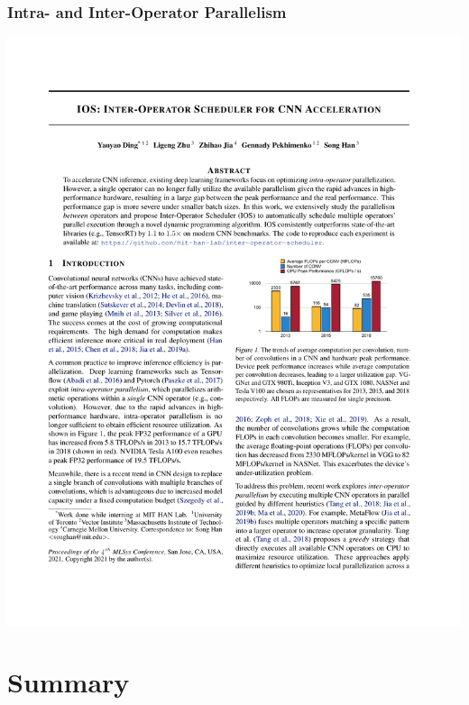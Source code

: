 \documentclass[12pt,aspectratio=169]{beamer}
\begin{document}
    \begin{frame}
        \frametitle{Intra- and Inter-Operator Parallelism}

        \begin{center}
            \includegraphics[page=10,trim=10.6cm 21.9cm 2.2cm 3cm,clip,scale=1.1]{paper.pdf}
        \end{center}
    \end{frame}

    \section{Summary}
\end{document}
